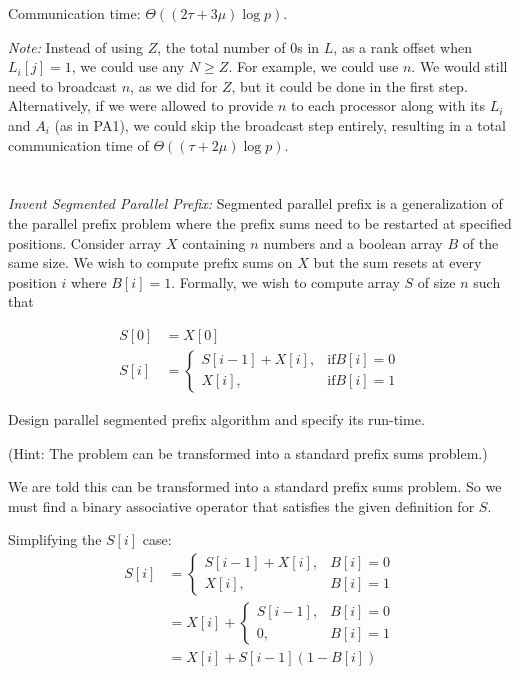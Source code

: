 \documentclass{article}
\newcommand{\aln}[1]{\begin{align*}#1\end{align*}}
\newcommand{\?}{\stackrel{?}{=}}
\begin{document}
\quad Communication time: $\Theta(\left(2\tau + 3\mu\right)\log{p})$.

\quad \textit{Note:}
Instead of using $Z$, the total number of $0$s in $L$, as a rank offset when $L_i[j] = 1$, we could use any $N \geq Z$.
For example, we could use $n$.
We would still need to broadcast $n$, as we did for $Z$, but it could be done in the first step.
Alternatively, if we were allowed to provide $n$ to each processor along with its $L_i$ and $A_i$ (as in PA1), we could skip the broadcast step entirely, resulting in a total communication time of $\Theta(\left(\tau + 2\mu\right)\log{p})$.

\section{}

\textsl{Invent Segmented Parallel Prefix:}
Segmented parallel prefix is a generalization of the parallel prefix problem where the prefix sums need to be restarted at specified positions.
Consider array $X$ containing $n$ numbers and a boolean array $B$ of the same size.
We wish to compute prefix sums on $X$ but the sum resets at every position $i$ where $B[i] = 1$.
Formally, we wish to compute array $S$ of size $n$ such that

\aln{
  S[0] &= X[0]\\
  S[i] &=
    \begin{cases*}
      S[i-1] + X[i],&\text{if} B[i] = 0\\
      X[i],&\text{if} B[i] = 1
    \end{cases*}
}

Design parallel segmented prefix algorithm and specify its run-time.

(Hint: The problem can be transformed into a standard prefix sums problem.)

\hbox{}

\quad We are told this can be transformed into a standard prefix sums problem.
So we must find a binary associative operator that satisfies the given definition for $S$.

Simplifying the $S[i]$ case:
\aln{
  S[i] &=
    \begin{cases*}
      S[i-1] + X[i],&B[i] = 0\\
      X[i],&B[i] = 1
    \end{cases*}\\
    &=
    X[i] + \begin{cases*}
      S[i-1],&B[i] = 0\\
      0, &B[i] = 1
    \end{cases*}\\
    &=
    X[i] + S[i-1](1 - B[i])
}
\end{document}
